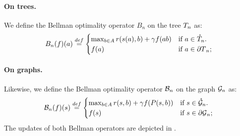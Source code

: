 \documentclass[runningheads]{llncs}
\begin{document}
\begin{definition}
	\label{def:bellman}
	\paragraph{\textbf{On trees.}} We define the Bellman optimality operator $B_n$ on the tree $T_n$ as:
	\begin{equation}
	\label{eq:bellman-tree}
	B_n(f)(a) \stackrel{def}{=} \begin{cases}
	\max_{b\in A} r(s(a), b) + \gamma f({ab})
	& \text{if $a\in\mathring{T}_n$.} \\
	f(a) & \text{if $a\in{\partial T}_n$;}
	\end{cases}
	\end{equation}
	
	\paragraph{\textbf{On graphs.}} Likewise, we define the Bellman optimality operator $\mathcal{B}_n$ on the graph $\mathcal{G}_n$ as:
	\begin{equation}
	\label{eq:bellman-graph}
	\mathcal{B}_n(f)(s) \stackrel{def}{=} \begin{cases}
	\max_{b\in A} r(s, b) + \gamma f(P(s,b))
	& \text{if $s\in\mathring{\mathcal{G}}_n$.} \\
	f(s) & \text{if $s\in{\partial \mathcal{G}}_n$;}
	\end{cases}
	\end{equation}
	The updates of both Bellman operators are depicted in .
\end{definition}

\end{document}
